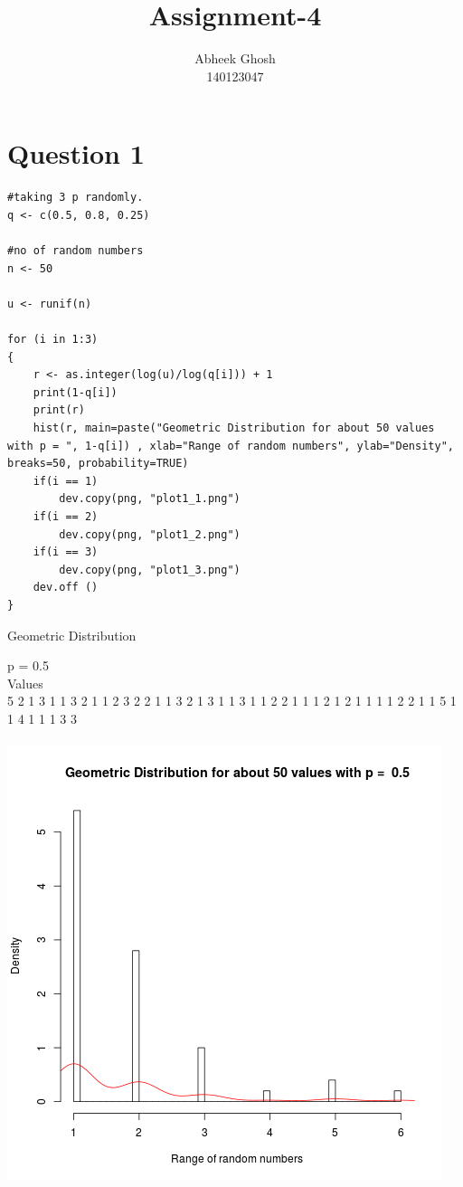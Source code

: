 \documentclass{article}
\begin{document}
	\title{\textbf{Assignment-4}}
	\author{Abheek Ghosh \\ 
		140123047 }
	
	\maketitle
	

\section{Question 1}


\begin{lstlisting}
#taking 3 p randomly.
q <- c(0.5, 0.8, 0.25)

#no of random numbers
n <- 50

u <- runif(n)

for (i in 1:3)
{
	r <- as.integer(log(u)/log(q[i])) + 1
	print(1-q[i])
	print(r)
	hist(r, main=paste("Geometric Distribution for about 50 values with p = ", 1-q[i]) , xlab="Range of random numbers", ylab="Density", breaks=50, probability=TRUE)
	if(i == 1)
		dev.copy(png, "plot1_1.png")
	if(i == 2)
		dev.copy(png, "plot1_2.png")
	if(i == 3)
		dev.copy(png, "plot1_3.png")
	dev.off ()
}
\end{lstlisting}
\pagebreak

Geometric Distribution

p = 0.5\\
Values\\
5 2 1 3 1 1 3 2 1 1 2 3 2 2 1 1 3 2 1 3 1 1 3 1 1 2 2 1 1 1 2 1 2 1 1 1 1 2
2 1 1 5 1 1 4 1 1 1 3 3\\\\
\includegraphics{"plot1_1"}
\pagebreak
\end{document}
